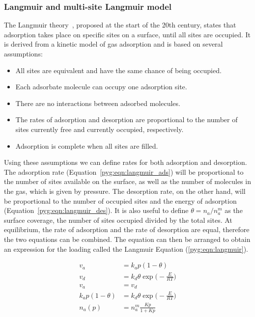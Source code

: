 \subsubsection{Langmuir and multi-site Langmuir
	model}\label{pyg:models:langmuir}

The Langmuir theory~\cite{langmuirAdsorptionGasesPlane1918a},
proposed at the start of the 20th century, states that
adsorption takes place on specific sites on a surface, until
all sites are occupied.
It is derived from a kinetic model of gas adsorption and
is based on several assumptions:

\begin{itemize}

	\item All sites are equivalent and have the same chance of
	      being occupied.
	\item Each adsorbate molecule can occupy one adsorption site.
	\item There are no interactions between adsorbed molecules.
	\item The rates of adsorption and desorption are proportional
	      to the number
	      of sites currently free and currently occupied,
	      respectively.
	\item Adsorption is complete when all sites are filled.

\end{itemize}

Using these assumptions we can define rates for both adsorption and
desorption. The adsorption rate (Equation~\ref{pyg:eqn:langmuir_ads})
will be proportional to the number of sites available on the surface,
as well as the number of molecules in the gas, which is given by
pressure.
The desorption rate, on the other hand, will be proportional to the
number of occupied sites and the energy of adsorption
(Equation~\ref{pyg:eqn:langmuir_des}).
It is also useful to define \(\theta = n_a/n_a^m\) as the surface
coverage,
the number of sites occupied divided by the total sites. At
equilibrium,
the rate of adsorption and the rate of
desorption are equal, therefore the two equations can be combined.
The equation can then be arranged to obtain an expression for the
loading called the Langmuir Equation (\ref{pyg:eqn:langmuir}).

\begin{align}
	v_a                & = k_a p (1 - \theta) \label{pyg:eqn:langmuir_ads} \\
	v_d                & = k_d \theta \exp{\Big(-\frac{E}{RT}\Big)}
	\label{pyg:eqn:langmuir_des}                                           \\
	v_a                & = v_d                                             \\
	k_a p (1 - \theta) & = k_d \theta \exp{\Big(-\frac{E}{RT}\Big)}        \\
	n_a(p)             & = n_a^m \frac{Kp}{1+Kp} \label{pyg:eqn:langmuir}
\end{align}

